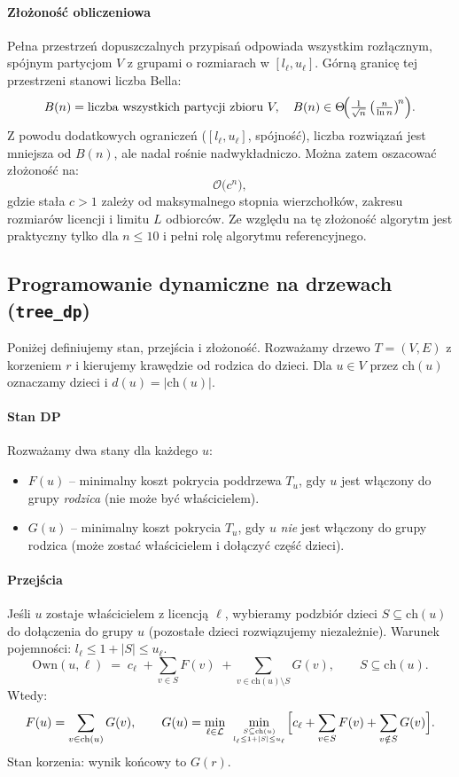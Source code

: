 \paragraph{Złożoność obliczeniowa}
Pełna przestrzeń dopuszczalnych przypisań odpowiada wszystkim rozłącznym, spójnym partycjom $V$ z grupami o rozmiarach w $[l_\ell,u_\ell]$. Górną granicę tej przestrzeni stanowi liczba Bella:
\[
B(n)=\text{liczba wszystkich partycji zbioru }V,\quad
B(n)\in\Theta\!\Bigl(\tfrac{1}{\sqrt n}\,\bigl(\tfrac{n}{\ln n}\bigr)^{\!n}\Bigr).
\]
Z powodu dodatkowych ograniczeń ($[l_\ell,u_\ell]$, spójność), liczba rozwiązań jest mniejsza od $B(n)$, ale nadal rośnie nadwykładniczo. Można zatem oszacować złożoność na:
\[
\mathcal{O}\bigl(c^n\bigr),
\]
gdzie stała $c>1$ zależy od maksymalnego stopnia wierzchołków, zakresu rozmiarów licencji i limitu $L$ odbiorców. Ze względu na tę złożoność algorytm jest praktyczny tylko dla $n\le10$ i pełni rolę algorytmu referencyjnego.

\subsection{Programowanie dynamiczne na drzewach (\texttt{tree\_dp})}\label{subsec:treedp}
Poniżej definiujemy stan, przejścia i złożoność. Rozważamy drzewo $T=(V,E)$ z korzeniem $r$ i kierujemy krawędzie od rodzica do dzieci. Dla $u\in V$ przez $\mathrm{ch}(u)$ oznaczamy dzieci i $d(u)=|\mathrm{ch}(u)|$.

\paragraph{Stan DP}
Rozważamy dwa stany dla każdego $u$:
\begin{itemize}
  \item $F(u)$ – minimalny koszt pokrycia poddrzewa $T_u$, gdy $u$ jest włączony do grupy \emph{rodzica} (nie może być właścicielem).
  \item $G(u)$ – minimalny koszt pokrycia $T_u$, gdy $u$ \emph{nie} jest włączony do grupy rodzica (może zostać właścicielem i dołączyć część dzieci).
\end{itemize}

\paragraph{Przejścia} Jeśli $u$ zostaje właścicielem z licencją $\ell$, wybieramy podzbiór dzieci $S\subseteq \mathrm{ch}(u)$ do dołączenia do grupy $u$ (pozostałe dzieci rozwiązujemy niezależnie). Warunek pojemności: $l_\ell \le 1+|S| \le u_\ell$.
\[
\textstyle\mathrm{Own}(u,\ell) \;=\; c_\ell\; +\! \sum\limits_{v\in S} F(v)\; +\! \sum\limits_{v\in \mathrm{ch}(u)\setminus S} G(v),\qquad S\subseteq\mathrm{ch}(u).
\]
Wtedy:
\[
F(u)= \sum\limits_{v\in\mathrm{ch}(u)} G(v),\qquad
G(u)= \min\limits_{\ell\in\mathcal{L}}\ \min\limits_{S\subseteq\mathrm{ch}(u)\atop l_\ell\le 1+|S|\le u_\ell} \Bigl[ c_\ell + \sum\limits_{v\in S} F(v) + \sum\limits_{v\notin S} G(v) \Bigr].
\]
Stan korzenia: wynik końcowy to $G(r)$.


